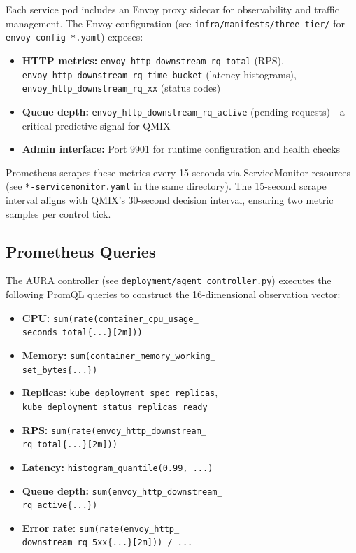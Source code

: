 \documentclass[conference]{IEEEtran}
\begin{document}
Each service pod includes an Envoy proxy sidecar for observability and
traffic management. The Envoy configuration (see
\texttt{infra/manifests/three-tier/} for \texttt{envoy-config-*.yaml})
exposes:

\begin{itemize}
\item \textbf{HTTP metrics:} \texttt{envoy\_http\_downstream\_rq\_total}
  (RPS), \texttt{envoy\_http\_downstream\_rq\_time\_bucket} (latency
  histograms), \texttt{envoy\_http\_downstream\_rq\_xx} (status codes)
\item \textbf{Queue depth:} \texttt{envoy\_http\_downstream\_rq\_active}
  (pending requests)---a critical predictive signal for QMIX
\item \textbf{Admin interface:} Port 9901 for runtime configuration and
  health checks
\end{itemize}

Prometheus scrapes these metrics every 15 seconds via ServiceMonitor
resources (see \texttt{*-servicemonitor.yaml} in the same directory).
The 15-second scrape interval aligns with QMIX's 30-second decision
interval, ensuring two metric samples per control tick.

\subsection{Prometheus Queries}

The AURA controller (see \texttt{deployment/agent\_controller.py})
executes the following PromQL queries to construct the 16-dimensional
observation vector:

\begin{itemize}
\item \textbf{CPU:} \texttt{sum(rate(container\_cpu\_usage\_\\
  seconds\_total\{...\}[2m]))}
\item \textbf{Memory:} \texttt{sum(container\_memory\_working\_\\
  set\_bytes\{...\})}
\item \textbf{Replicas:} \texttt{kube\_deployment\_spec\_replicas},
  \texttt{kube\_deployment\_status\_replicas\_ready}
\item \textbf{RPS:} \texttt{sum(rate(envoy\_http\_downstream\_\\
  rq\_total\{...\}[2m]))}
\item \textbf{Latency:} \texttt{histogram\_quantile(0.99, ...)}
\item \textbf{Queue depth:} \texttt{sum(envoy\_http\_downstream\_\\
  rq\_active\{...\})}
\item \textbf{Error rate:} \texttt{sum(rate(envoy\_http\_\\
  downstream\_rq\_5xx\{...\}[2m])) / ...}
\end{itemize}
\end{document}
